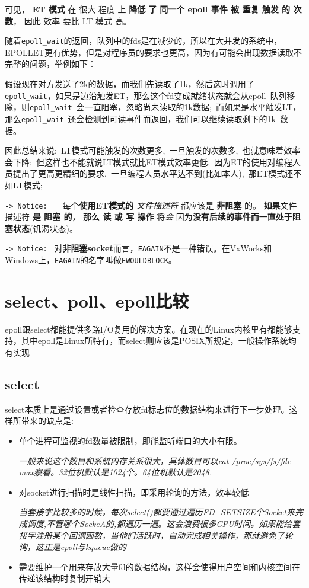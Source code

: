 \documentclass[UTF8,a4paper,12pt]{ctexbook}
\begin{document}
				可见， \textbf{ET 模式} 在 很大 程度 上 \textbf{降低 了} \textbf{同一个 epoll 事件 被 重复 触发 的 次数}， 因此 效率 要比 LT 模式 高。
				
				随着\verb|epoll_wait|的返回，队列中的fds是在减少的，所以在大并发的系统中，EPOLLET更有优势，但是对程序员的要求也更高，因为有可能会出现数据读取不完整的问题，举例如下：
				
				假设现在对方发送了2k的数据，而我们先读取了1k，然后这时调用了\verb|epoll_wait|，如果是边沿触发ET，那么这个fd变成就绪状态就会从epoll 队列移除，则\verb|epoll_wait| 会一直阻塞，忽略尚未读取的1k数据; 而如果是水平触发LT，那么\verb|epoll_wait| 还会检测到可读事件而返回，我们可以继续读取剩下的1k 数据。
				
				因此总结来说: LT模式可能触发的次数更多, 一旦触发的次数多, 也就意味着效率会下降; 但这样也不能就说LT模式就比ET模式效率更低, 因为ET的使用对编程人员提出了更高更精细的要求, 一旦编程人员水平达不到(比如本人), 那ET模式还不如LT模式;
				
				\verb|-> Notice: |　 每个\textbf{使用ET模式的} \textit{文件描述符} 都应该是 \textbf{非阻塞} 的。 \textbf{如果}文件描述符 \textbf{是 阻塞 的}， \textbf{那么 读 或 写 操作} 将\textit{会} 因为\textbf{没有后续的事件而一直处于阻塞状态}(饥渴状态)。
				
				\verb|-> Notice: | 对\textbf{非阻塞socket}而言，\verb|EAGAIN|不是一种错误。在VxWorks和Windows上，\verb|EAGAIN|的名字叫做\verb|EWOULDBLOCK|。
	\section{select、poll、epoll比较}
		epoll跟select都能提供多路I/O复用的解决方案。在现在的Linux内核里有都能够支持，其中epoll是Linux所特有，而select则应该是POSIX所规定，一般操作系统均有实现
		                               
		\subsection{select}             
			select本质上是通过设置或者检查存放fd标志位的数据结构来进行下一步处理。这样所带来的缺点是:
			\begin{itemize}                   
				\item 单个进程可监视的fd数量被限制，即能监听端口的大小有限。 
				
				\textit{一般来说这个数目和系统内存关系很大，具体数目可以cat /proc/sys/fs/file-max察看。32位机默认是1024个。64位机默认是2048.}
				
				\item 对socket进行扫描时是线性扫描，即采用轮询的方法，效率较低
				
				\textit{当套接字比较多的时候，每次select()都要通过遍历FD\_SETSIZE个Socket来完成调度,不管哪个SockeA的,都遍历一遍。这会浪费很多CPU时间。如果能给套接字注册某个回调函数，当他们活跃时，自动完成相关操作，那就避免了轮询，这正是epoll与kqueue做的}
				\item 需要维护一个用来存放大量fd的数据结构，这样会使得用户空间和内核空间在传递该结构时复制开销大
			\end{itemize}
		
\end{document}
